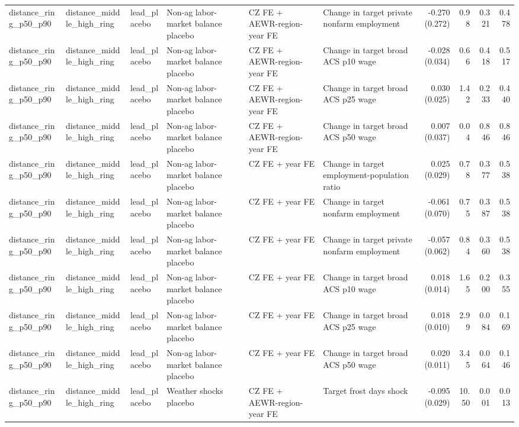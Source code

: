 \begin{tabular}{llllllrrrr}
distance_ring_p50_p90 & distance_middle_high_ring & lead_placebo & Non-ag labor-market balance placebo & CZ FE + AEWR-region-year FE & Change in target private nonfarm employment & -0.270 (0.272) & 0.98 & 0.321 & 0.478 \\
distance_ring_p50_p90 & distance_middle_high_ring & lead_placebo & Non-ag labor-market balance placebo & CZ FE + AEWR-region-year FE & Change in target broad ACS p10 wage & -0.028 (0.034) & 0.66 & 0.418 & 0.517 \\
distance_ring_p50_p90 & distance_middle_high_ring & lead_placebo & Non-ag labor-market balance placebo & CZ FE + AEWR-region-year FE & Change in target broad ACS p25 wage & 0.030 (0.025) & 1.42 & 0.233 & 0.440 \\
distance_ring_p50_p90 & distance_middle_high_ring & lead_placebo & Non-ag labor-market balance placebo & CZ FE + AEWR-region-year FE & Change in target broad ACS p50 wage & 0.007 (0.037) & 0.04 & 0.846 & 0.846 \\
distance_ring_p50_p90 & distance_middle_high_ring & lead_placebo & Non-ag labor-market balance placebo & CZ FE + year FE & Change in target employment-population ratio & 0.025 (0.029) & 0.78 & 0.377 & 0.538 \\
distance_ring_p50_p90 & distance_middle_high_ring & lead_placebo & Non-ag labor-market balance placebo & CZ FE + year FE & Change in target nonfarm employment & -0.061 (0.070) & 0.75 & 0.387 & 0.538 \\
distance_ring_p50_p90 & distance_middle_high_ring & lead_placebo & Non-ag labor-market balance placebo & CZ FE + year FE & Change in target private nonfarm employment & -0.057 (0.062) & 0.84 & 0.360 & 0.538 \\
distance_ring_p50_p90 & distance_middle_high_ring & lead_placebo & Non-ag labor-market balance placebo & CZ FE + year FE & Change in target broad ACS p10 wage & 0.018 (0.014) & 1.65 & 0.200 & 0.355 \\
distance_ring_p50_p90 & distance_middle_high_ring & lead_placebo & Non-ag labor-market balance placebo & CZ FE + year FE & Change in target broad ACS p25 wage & 0.018 (0.010) & 2.99 & 0.084 & 0.169 \\
distance_ring_p50_p90 & distance_middle_high_ring & lead_placebo & Non-ag labor-market balance placebo & CZ FE + year FE & Change in target broad ACS p50 wage & 0.020 (0.011) & 3.45 & 0.064 & 0.146 \\
distance_ring_p50_p90 & distance_middle_high_ring & lead_placebo & Weather shocks placebo & CZ FE + AEWR-region-year FE & Target frost days shock & -0.095 (0.029) & 10.50 & 0.001 & 0.013 \\

\end{tabular}
